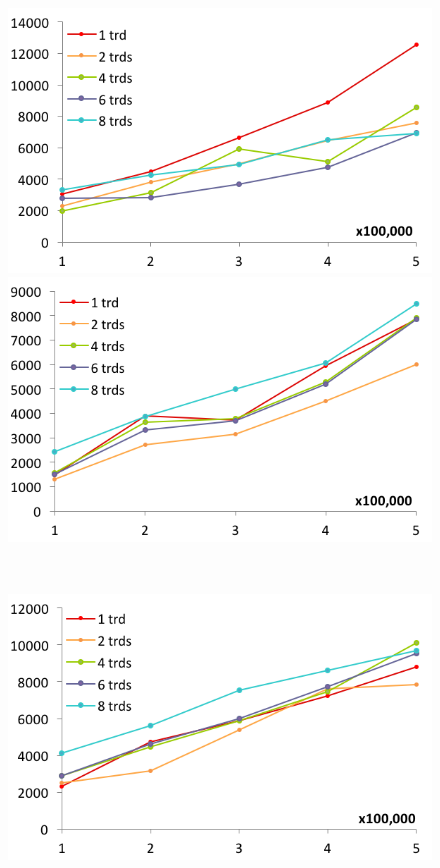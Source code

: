 \begin{figure}[htbp]
  \centering
  \begin{minipage}{.45\textwidth}
    \includegraphics[width=\textwidth]{experimentalResults/1-Finance-rdfox}
  \end{minipage}
  \begin{minipage}{.45\textwidth}
    \includegraphics[width=\textwidth]{experimentalResults/2-molecule-rdfox}
  \end{minipage}\\
  \begin{minipage}{.45\textwidth}
    \includegraphics[width=\textwidth]{experimentalResults/3-NIF_GrossAnatomy-rdfox}

\end{minipage}
\end{figure}
